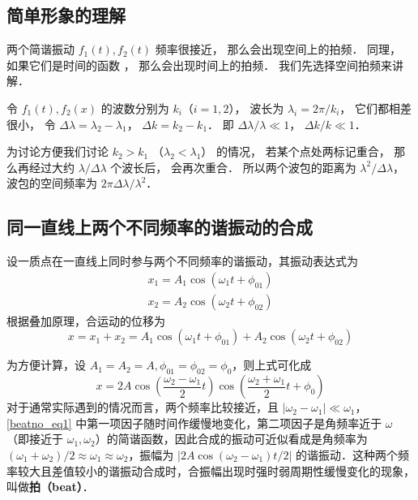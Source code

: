 
\begin{issues}
\issueDraft
\end{issues}


\subsection{简单形象的理解}

两个简谐振动 $f_1(t), f_2(t)$ 频率很接近， 那么会出现空间上的拍频． 同理， 如果它们是时间的函数 ， 那么会出现时间上的拍频． 我们先选择空间拍频来讲解．

令 $f_1(t), f_2(x)$ 的波数分别为 $k_i$（$i=1,2$）， 波长为 $\lambda_i = 2\pi/k_i$， 它们都相差很小， 令 $\Delta \lambda = \lambda_2 - \lambda_1$， $\Delta k = k_2 - k_1$． 即 $\Delta \lambda/\lambda \ll 1$， $\Delta k/k \ll 1$．

为讨论方便我们讨论 $k_2 > k_1$ （$\lambda_2 < \lambda_1$） 的情况， 若某个点处两标记重合， 那么再经过大约 $\lambda/\Delta\lambda$ 个波长后， 会再次重合． 所以两个波包的距离为 $\lambda^2/\Delta\lambda$， 波包的空间频率为 $2\pi \Delta \lambda/\lambda^2$．


\subsection{同一直线上两个不同频率的谐振动的合成}

设一质点在一直线上同时参与两个不同频率的谐振动，其振动表达式为
\begin{equation}
\begin{array}{l}x_{1}=A_{1} \cos \left(\omega_{1} t+\phi_{01}\right) \\ x_{2}=A_{2} \cos \left(\omega_{2} t+\phi_{02}\right)\end{array}
\end{equation}
根据叠加原理，合运动的位移为
\begin{equation}
x=x_{1}+x_{2}=A_{1} \cos \left(\omega_{1} t+\phi_{01}\right)+A_{2} \cos \left(\omega_{2} t+\phi_{02}\right)
\end{equation}

为方便计算，设 $A_1=A_2=A,\phi_{01}=\phi_{02}=\phi_{0}$，则上式可化成
\begin{equation} \label{beatno_eq1}
x=2 A \cos \left(\frac{\omega_{2}-\omega_{1}}{2} t\right) \cos \left(\frac{\omega_{2}+\omega_{1}}{2} t+\phi_{0}\right)
\end{equation}
对于通常实际遇到的情况而言，两个频率比较接近，且 $\left|\omega_{2}-\omega_{1}\right|\ll \omega_1$，\autoref{beatno_eq1} 中第一项因子随时间作缓慢地变化，第二项因子是角频率近于 $\omega$（即接近于 $\omega_1,\omega_2$）的简谐函数，因此合成的振动可近似看成是角频率为 $(\omega_{1}+\omega_{2})/2 \approx \omega_{1} \approx \omega_{2}$，振幅为 $\left | 2 A \cos (\omega_{2}-\omega_{1})t/{2} \right |$ 的谐振动．这种两个频率较大且差值较小的谐振动合成时，合振幅出现时强时弱周期性缓慢变化的现象，叫做\textbf{拍（beat）}．

